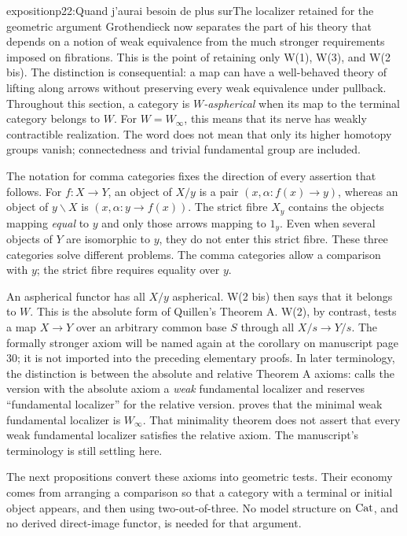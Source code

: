 \begin{dcomment}{exposition}{p22:Quand j'aurai besoin de plus sur}{The localizer retained for the geometric argument}
Grothendieck now separates the part of his theory that depends on a notion of weak equivalence from the much stronger requirements imposed on fibrations. This is the point of retaining only W(1), W(3), and W(2 bis). The distinction is consequential: a map can have a well-behaved theory of lifting along arrows without preserving every weak equivalence under pullback. Throughout this section, a category is \emph{$W$-aspherical} when its map to the terminal category belongs to $W$. For $W=W_\infty$, this means that its nerve has weakly contractible realization. The word does not mean that only its higher homotopy groups vanish; connectedness and trivial fundamental group are included.

The notation for comma categories fixes the direction of every assertion that follows. For $f:X\to Y$, an object of $X/y$ is a pair $(x,\alpha:f(x)\to y)$, whereas an object of $y\backslash X$ is $(x,\alpha:y\to f(x))$. The strict fibre $X_y$ contains the objects mapping \emph{equal} to $y$ and only those arrows mapping to $1_y$. Even when several objects of $Y$ are isomorphic to $y$, they do not enter this strict fibre. These three categories solve different problems. The comma categories allow a comparison with $y$; the strict fibre requires equality over $y$.

An aspherical functor has all $X/y$ aspherical. W(2 bis) then says that it belongs to $W$. This is the absolute form of Quillen's Theorem A. W(2), by contrast, tests a map $X\to Y$ over an arbitrary common base $S$ through all $X/s\to Y/s$. The formally stronger axiom will be named again at the corollary on manuscript page 30; it is not imported into the preceding elementary proofs. In later terminology, the distinction is between the absolute and relative Theorem A axioms: \citet[\S1.1]{Maltsiniotis2012Exact} calls the version with the absolute axiom a \emph{weak} fundamental localizer and reserves ``fundamental localizer'' for the relative version. \citet[Theorem 6.1.18]{Cisinski2006} proves that the minimal weak fundamental localizer is $W_\infty$. That minimality theorem does not assert that every weak fundamental localizer satisfies the relative axiom. The manuscript's terminology is still settling here.

The next propositions convert these axioms into geometric tests. Their economy comes from arranging a comparison so that a category with a terminal or initial object appears, and then using two-out-of-three. No model structure on $\mathrm{Cat}$, and no derived direct-image functor, is needed for that argument.
\end{dcomment}



